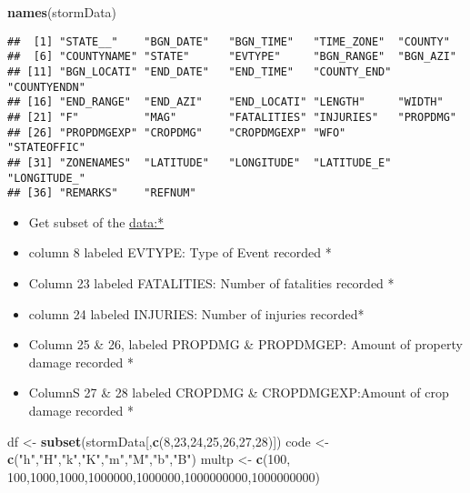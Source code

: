 \documentclass[]{article}
\newenvironment{Shaded}{\begin{snugshade}}{\end{snugshade}}
\newcommand{\KeywordTok}[1]{\textcolor[rgb]{0.13,0.29,0.53}{\textbf{#1}}}
\newcommand{\DecValTok}[1]{\textcolor[rgb]{0.00,0.00,0.81}{#1}}
\newcommand{\StringTok}[1]{\textcolor[rgb]{0.31,0.60,0.02}{#1}}
\newcommand{\NormalTok}[1]{#1}
\providecommand{\tightlist}{%
  \setlength{\itemsep}{0pt}\setlength{\parskip}{0pt}}
\begin{document}
\begin{Shaded}
\begin{Highlighting}[]
\KeywordTok{names}\NormalTok{(stormData) }
\end{Highlighting}
\end{Shaded}

\begin{verbatim}
##  [1] "STATE__"    "BGN_DATE"   "BGN_TIME"   "TIME_ZONE"  "COUNTY"    
##  [6] "COUNTYNAME" "STATE"      "EVTYPE"     "BGN_RANGE"  "BGN_AZI"   
## [11] "BGN_LOCATI" "END_DATE"   "END_TIME"   "COUNTY_END" "COUNTYENDN"
## [16] "END_RANGE"  "END_AZI"    "END_LOCATI" "LENGTH"     "WIDTH"     
## [21] "F"          "MAG"        "FATALITIES" "INJURIES"   "PROPDMG"   
## [26] "PROPDMGEXP" "CROPDMG"    "CROPDMGEXP" "WFO"        "STATEOFFIC"
## [31] "ZONENAMES"  "LATITUDE"   "LONGITUDE"  "LATITUDE_E" "LONGITUDE_"
## [36] "REMARKS"    "REFNUM"
\end{verbatim}

\begin{itemize}
\tightlist
\item
  Get subset of the \url{data:*}
\item
  column 8 labeled EVTYPE: Type of Event recorded *
\item
  Column 23 labeled FATALITIES: Number of fatalities recorded *
\item
  column 24 labeled INJURIES: Number of injuries recorded*
\item
  Column 25 \& 26, labeled PROPDMG \& PROPDMGEP: Amount of property
  damage recorded *
\item
  ColumnS 27 \& 28 labeled CROPDMG \& CROPDMGEXP:Amount of crop damage
  recorded *
\end{itemize}

\begin{Shaded}
\begin{Highlighting}[]
\NormalTok{df <-}\StringTok{ }\KeywordTok{subset}\NormalTok{(stormData[,}\KeywordTok{c}\NormalTok{(}\DecValTok{8}\NormalTok{,}\DecValTok{23}\NormalTok{,}\DecValTok{24}\NormalTok{,}\DecValTok{25}\NormalTok{,}\DecValTok{26}\NormalTok{,}\DecValTok{27}\NormalTok{,}\DecValTok{28}\NormalTok{)])}
\NormalTok{code <-}\StringTok{ }\KeywordTok{c}\NormalTok{(}\StringTok{"h"}\NormalTok{,}\StringTok{"H"}\NormalTok{,}\StringTok{"k"}\NormalTok{,}\StringTok{"K"}\NormalTok{,}\StringTok{"m"}\NormalTok{,}\StringTok{"M"}\NormalTok{,}\StringTok{"b"}\NormalTok{,}\StringTok{"B"}\NormalTok{)}
\NormalTok{multp <-}\StringTok{ }\KeywordTok{c}\NormalTok{(}\DecValTok{100}\NormalTok{, }\DecValTok{100}\NormalTok{,}\DecValTok{1000}\NormalTok{,}\DecValTok{1000}\NormalTok{,}\DecValTok{1000000}\NormalTok{,}\DecValTok{1000000}\NormalTok{,}\DecValTok{1000000000}\NormalTok{,}\DecValTok{1000000000}\NormalTok{)}
\end{Highlighting}
\end{Shaded}
\end{document}
